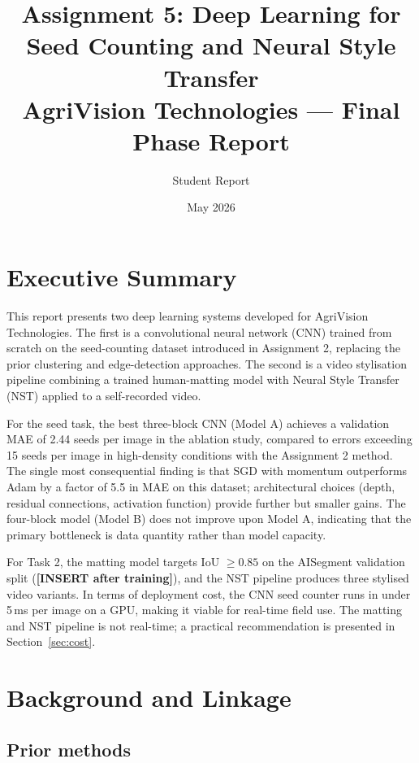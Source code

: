 \documentclass[11pt,a4paper]{article}
\title{\textbf{Assignment 5: Deep Learning for Seed Counting and Neural Style Transfer}\\[0.5em]
\large AgriVision Technologies --- Final Phase Report}
\author{Student Report}
\date{May 2026}
\begin{document}
\maketitle
\tableofcontents
\newpage

\section{Executive Summary}

This report presents two deep learning systems developed for AgriVision Technologies.
The first is a convolutional neural network (CNN) trained from scratch on the seed-counting
dataset introduced in Assignment 2, replacing the prior clustering and edge-detection
approaches. The second is a video stylisation pipeline combining a trained human-matting
model with Neural Style Transfer (NST) applied to a self-recorded video.

For the seed task, the best three-block CNN (Model A) achieves a validation MAE of 2.44
seeds per image in the ablation study, compared to errors exceeding 15 seeds per image in
high-density conditions with the Assignment 2 method. The single most consequential
finding is that SGD with momentum outperforms Adam by a factor of 5.5 in MAE on this
dataset; architectural choices (depth, residual connections, activation function) provide
further but smaller gains. The four-block model (Model B) does not improve upon Model A,
indicating that the primary bottleneck is data quantity rather than model capacity.

For Task 2, the matting model targets IoU $\geq 0.85$ on the AISegment validation split
(\textbf{[INSERT after training]}), and the NST pipeline produces three stylised video
variants. In terms of deployment cost, the CNN seed counter runs in under 5\,ms per image
on a GPU, making it viable for real-time field use. The matting and NST pipeline is not
real-time; a practical recommendation is presented in Section~\ref{sec:cost}.

\section{Background and Linkage}

\subsection{Prior methods}
\end{document}
